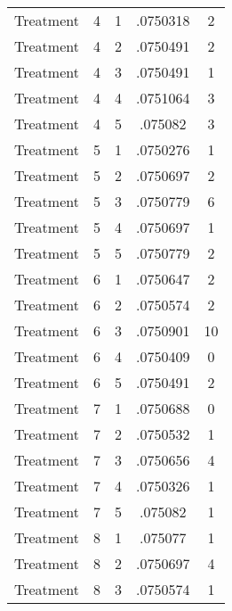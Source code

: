 \begin{tabular}{l*{4}{c}}
Treatment           &           4&           1&    .0750318&           2\\
Treatment           &           4&           2&    .0750491&           2\\
Treatment           &           4&           3&    .0750491&           1\\
Treatment           &           4&           4&    .0751064&           3\\
Treatment           &           4&           5&     .075082&           3\\
Treatment           &           5&           1&    .0750276&           1\\
Treatment           &           5&           2&    .0750697&           2\\
Treatment           &           5&           3&    .0750779&           6\\
Treatment           &           5&           4&    .0750697&           1\\
Treatment           &           5&           5&    .0750779&           2\\
Treatment           &           6&           1&    .0750647&           2\\
Treatment           &           6&           2&    .0750574&           2\\
Treatment           &           6&           3&    .0750901&          10\\
Treatment           &           6&           4&    .0750409&           0\\
Treatment           &           6&           5&    .0750491&           2\\
Treatment           &           7&           1&    .0750688&           0\\
Treatment           &           7&           2&    .0750532&           1\\
Treatment           &           7&           3&    .0750656&           4\\
Treatment           &           7&           4&    .0750326&           1\\
Treatment           &           7&           5&     .075082&           1\\
Treatment           &           8&           1&     .075077&           1\\
Treatment           &           8&           2&    .0750697&           4\\
Treatment           &           8&           3&    .0750574&           1\\

\end{tabular}
